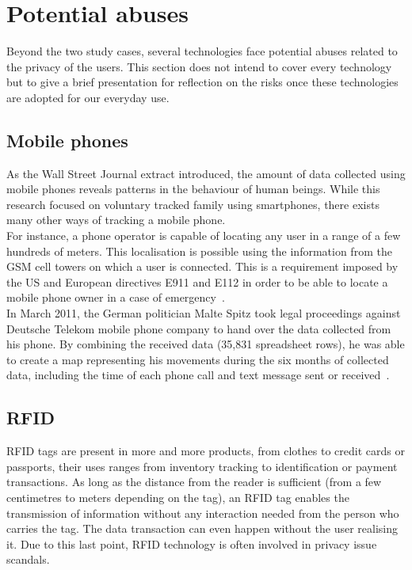 \section{Potential abuses}

Beyond the two study cases, several technologies face potential abuses related to the privacy of the users.
This section does not intend to cover every technology but to give a brief presentation for reflection on the risks once these technologies are adopted for our everyday use.\\

\subsection{Mobile phones}

As the Wall Street Journal extract introduced, the amount of data collected using mobile phones reveals patterns in the behaviour of human beings.
While this research focused on voluntary tracked family using smartphones, there exists many other ways of tracking a mobile phone.\\

For instance, a phone operator is capable of locating any user in a range of a few hundreds of meters.
This localisation is possible using the information from the GSM cell towers on which a user is connected.
This is a requirement imposed by the US and European directives E911 and E112 in order to be able to locate a mobile phone owner in a case of emergency~\cite{e112-recom}.\\

In March 2011, the German politician Malte Spitz took legal proceedings against Deutsche Telekom mobile phone company to hand over the data collected from his phone.
By combining the received data (35,831 spreadsheet rows), he was able to create a map representing his movements during the six months of collected data, including the time of each phone call and text message sent or received~\cite{german-phone-tracking}.

\subsection{RFID}

RFID tags are present in more and more products, from clothes to credit cards or passports, their uses ranges from inventory tracking to identification or payment transactions.
As long as the distance from the reader is sufficient (from a few centimetres to meters depending on the tag), an RFID tag enables the transmission of information without any interaction needed from the person who carries the tag.
The data transaction can even happen without the user realising it.
Due to this last point, RFID technology is often involved in privacy issue scandals.\\

